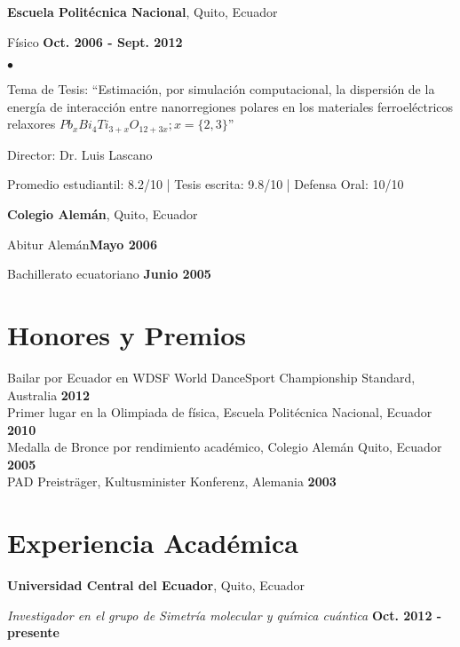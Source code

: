 \documentclass[margin,line]{res}
\newenvironment{list1}{
  \begin{list}{\ding{113}}{%
      \setlength{\itemsep}{0in}
      \setlength{\parsep}{0in} \setlength{\parskip}{0in}
      \setlength{\topsep}{0in} \setlength{\partopsep}{0in} 
      \setlength{\leftmargin}{0.17in}}}{\end{list}}
\newenvironment{list2}{
  \begin{list}{$\bullet$}{%
      \setlength{\itemsep}{0in}
      \setlength{\parsep}{0in} \setlength{\parskip}{0in}
      \setlength{\topsep}{0in} \setlength{\partopsep}{0in} 
      \setlength{\leftmargin}{0.2in}}}{\end{list}}
\begin{document}
\begin{resume}
  {\bf Escuela Politécnica Nacional}, Quito, Ecuador\\
  \vspace{-.1in}
  \begin{list1}
    \item[] Físico \hfill {\bf Oct. 2006 - Sept. 2012}\\
    \begin{list2}
    \vspace{-.1in}
      \item Tema de Tesis:  ``Estimación, por simulación computacional, la dispersión de
      la energía de interacción entre nanorregiones polares en los materiales ferroeléctricos
      relaxores $Pb_xBi_4Ti_{3+x}O_{12+3x}; x=\{2,3\}$''
      \item Director: Dr. Luis Lascano
      \item Promedio estudiantil: 8.2/10 | Tesis escrita: 9.8/10 | Defensa Oral: 10/10
    \end{list2}
  \end{list1}

  {\bf Colegio Alemán}, Quito, Ecuador\\
  \vspace{-.1in}
  \begin{list1}
    \item[] Abitur Alemán\hfill {\bf Mayo 2006}
    \item[] Bachillerato ecuatoriano \hfill {\bf Junio 2005}
  \end{list1}

\section{\sc Honores y Premios}
  Bailar por Ecuador en WDSF World DanceSport Championship Standard, Australia \hfill {\bf 2012}\\
  Primer lugar en la Olimpiada de física, Escuela Politécnica Nacional, Ecuador \hfill {\bf 2010}\\
  Medalla de Bronce por rendimiento académico, Colegio Alemán Quito, Ecuador \hfill {\bf 2005}\\
  PAD Preisträger, Kultusminister Konferenz, Alemania \hfill {\bf 2003}

\section{\sc Experiencia Académica}
  {\bf Universidad Central del Ecuador}, Quito, Ecuador
  \begin{list1}
    \item[] {\em Investigador en el grupo de Simetría molecular y química cuántica} \hfill {\bf Oct. 2012 -presente}
  \end{list1}


\end{resume}
\end{document}
